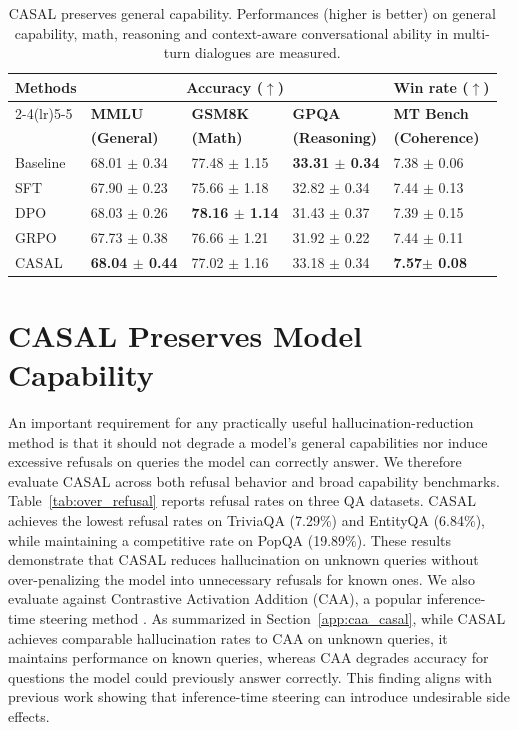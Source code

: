 \documentclass{article} %
\begin{document}
\begin{table}[htbp]
\centering
\small
\begin{tabularx}{\linewidth}{l *{3}{X} X}
\toprule
\textbf{Methods} &
\multicolumn{3}{c}{\textbf{Accuracy (}$\uparrow$\textbf{)}} &
\multicolumn{1}{c}{\textbf{Win rate (}$\uparrow$\textbf{)}} \\

\cmidrule(lr){2-4}\cmidrule(lr){5-5}
& \textbf{MMLU} & \textbf{GSM8K} & \textbf{GPQA} & \textbf{MT Bench} \\
& \textbf{(General)} & \textbf{(Math)} & \textbf{(Reasoning)} & \textbf{(Coherence)} \\
\midrule
Baseline & 68.01 $\pm$ 0.34 & 77.48 $\pm$ 1.15 & \textbf{33.31 $\pm$ 0.34} & 7.38 $\pm$ 0.06 \\
\midrule\midrule
SFT      & 67.90 $\pm$ 0.23 & 75.66 $\pm$ 1.18 & 32.82 $\pm$ 0.34 & 7.44 $\pm$ 0.13 \\
DPO      & 68.03 $\pm$ 0.26 & \textbf{78.16 $\pm$ 1.14} & 31.43 $\pm$ 0.37 & 7.39 $\pm$ 0.15\\
GRPO      & 67.73 $\pm$ 0.38 & 76.66 $\pm$ 1.21 & 31.92 $\pm$ 0.22 & 7.44 $\pm$ 0.11\\
CASAL    & \textbf{68.04 $\pm$ 0.44} & 77.02 $\pm$ 1.16 & 33.18 $\pm$ 0.34 & \textbf{7.57$\pm$ 0.08} \\
\bottomrule
\end{tabularx}
\caption{CASAL preserves general capability. Performances (higher is better) on general capability, math, reasoning and context-aware conversational ability in multi-turn dialogues are measured.}
\label{tab:general_capability}
\end{table}


\section{CASAL Preserves Model Capability}
An important requirement for any practically useful hallucination-reduction method is that it should not degrade a model's general capabilities nor induce excessive refusals on queries the model can correctly answer. We therefore evaluate CASAL across both refusal behavior and broad capability benchmarks.
Table~\ref{tab:over_refusal} reports refusal rates on three QA datasets. CASAL achieves the lowest refusal rates on TriviaQA (7.29\%) and EntityQA (6.84\%), while maintaining a competitive rate on PopQA (19.89\%). These results demonstrate that CASAL reduces hallucination on unknown queries without over-penalizing the model into unnecessary refusals for known ones. We also evaluate against Contrastive Activation Addition (CAA), a popular inference-time steering method \citep{contrastive_activation_addition}. As summarized in Section~\ref{app:caa_casal}, while CASAL achieves comparable hallucination rates to CAA on unknown queries, it maintains performance on known queries, whereas CAA degrades accuracy for questions the model could previously answer correctly. This finding aligns with previous work \citep{durmus2024steering, chen2025personavectors} showing that inference-time steering can introduce undesirable side effects.
\end{document}
